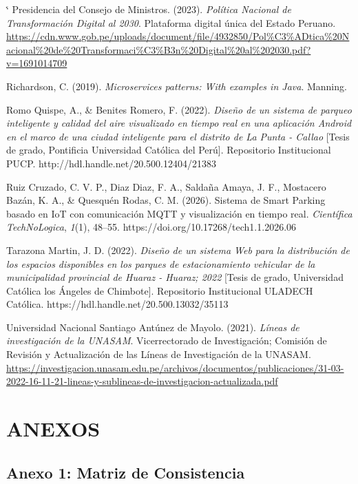 \documentclass[12pt,a4paper]{article}
\makeatletter
\renewenvironment{thebibliography}[1]{%
	\list{}{%
		\setlength{\leftmargin}{1.27cm}%
		\setlength{\itemindent}{-1.27cm}%
		\setlength{\labelwidth}{0pt}%
		\setlength{\labelsep}{0pt}%
		\usecounter{enumiv}%
		\let\p@enumiv\@empty
		\renewcommand\theenumiv{\@arabic\c@enumiv}}%
	\sloppy\clubpenalty4000\widowpenalty4000\sfcode`\.\@m}
	{\endlist}
\makeatother
\begin{document}
\begin{thebibliography}{99}
	Presidencia del Consejo de Ministros. (2023).
	\textit{Política Nacional de Transformación Digital al 2030}.
	Plataforma digital única del Estado Peruano.
	\url{https://cdn.www.gob.pe/uploads/document/file/4932850/Pol%C3%ADtica%20Nacional%20de%20Transformaci%C3%B3n%20Digital%20al%202030.pdf?v=1691014709}
	
	Richardson, C. (2019).
	\textit{Microservices patterns: With examples in Java}.
	Manning.
	
	Romo Quispe, A., \& Benites Romero, F. (2022).
	\textit{Diseño de un sistema de parqueo inteligente y calidad del aire visualizado en tiempo real en una aplicación Android en el marco de una ciudad inteligente para el distrito de La Punta - Callao}
	[Tesis de grado, Pontificia Universidad Católica del Perú].
	Repositorio Institucional PUCP.
	http://hdl.handle.net/20.500.12404/21383
	
	Ruiz Cruzado, C. V. P., Diaz Diaz, F. A., Saldaña Amaya, J. F., Mostacero Bazán, K. A., \& Quesquén Rodas, C. M. (2026).
	Sistema de Smart Parking basado en IoT con comunicación MQTT y visualización en tiempo real.
	\textit{Científica TechNoLogica}, \textit{1}(1), 48--55.
	https://doi.org/10.17268/tech1.1.2026.06
	
	Tarazona Martin, J. D. (2022).
	\textit{Diseño de un sistema Web para la distribución de los espacios disponibles en los parques de estacionamiento vehicular de la municipalidad provincial de Huaraz - Huaraz; 2022}
	[Tesis de grado, Universidad Católica los Ángeles de Chimbote].
	Repositorio Institucional ULADECH Católica.
	https://hdl.handle.net/20.500.13032/35113
	
	Universidad Nacional Santiago Antúnez de Mayolo. (2021).
	\textit{Líneas de investigación de la UNASAM}.
	Vicerrectorado de Investigación; Comisión de Revisión y Actualización de las Líneas de Investigación de la UNASAM.
	\url{https://investigacion.unasam.edu.pe/archivos/documentos/publicaciones/31-03-2022-16-11-21-lineas-y-sublineas-de-investigacion-actualizada.pdf}
	
\end{thebibliography}

\clearpage
\section{ANEXOS}

\subsection{Anexo 1: Matriz de Consistencia}
\end{document}
